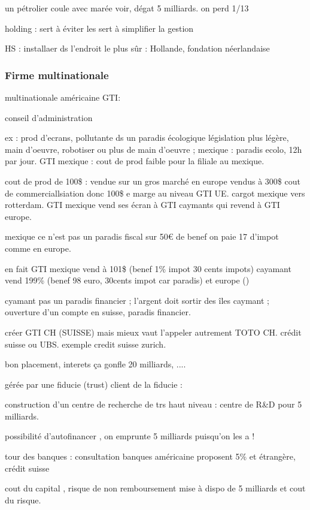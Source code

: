 \documentclass[a4paper,12pt]{article}
\begin{document}
un pétrolier coule avec marée voir, dégat 5 milliards.
on perd 1/13 

holding : sert à éviter les 
sert à simplifier la gestion

HS : installaer ds l'endroit le plus sûr : Hollande, fondation néerlandaise



\subsubsection { Firme multinationale}

multinationale américaine GTI:

conseil d'administration

ex : prod d'ecrans, pollutante ds un paradis écologique législation plus légère,
main d'oeuvre, robotiser ou plus de main d'oeuvre ; mexique : paradis ecolo, 12h par jour.
GTI mexique : cout de prod faible pour la filiale au mexique.

cout de prod de 100\$ : vendue sur un gros marché en europe vendus à 300\$ cout de commerciallsiation donc 100\$ e marge
au niveau GTI UE. cargot mexique vers rotterdam. GTI mexique vend ses écran à GTI caymants qui revend à GTI europe.

mexique ce n'est pas un paradis fiscal sur 50€ de benef on paie 17 d'impot comme en europe.

en fait GTI mexique vend à 101\$ (benef 1\% impot 30 cents impots)  cayamant vend 199\% (benef 98 euro, 30cents impot car paradis) et europe ()


cyamant pas un paradis financier ; l'argent doit sortir des îles caymant ; ouverture d'un compte en suisse, paradis financier.  

créer GTI CH (SUISSE) mais mieux vaut l'appeler autrement TOTO CH. crédit suisse ou UBS.
exemple credit suisse zurich.

bon placement, interets ça gonfle 20 milliards, ....

gérée par une fiducie (trust)
client de la fiducie : 

construction d'un centre de recherche de trs haut niveau : centre de R\&D pour 5 milliards.

possibilité d'autofinancer , on emprunte 5 milliards puisqu'on les a !

tour des banques : consultation banques américaine proposent 5\% et étrangère, crédit suisse 

cout du capital  , risque de non remboursement  mise à dispo de 5 milliards et cout du risque.
\end{document}

